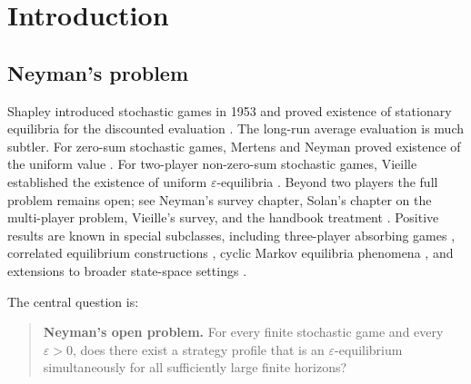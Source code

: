 \documentclass[12pt]{article}
\theoremstyle{definition}
\newcommand{\eps}{\varepsilon}
\newcommand{\1}{\mathbf{1}}
\begin{document}
\begin{abstract}
At each ordinary node and for frozen continuation values, every player faces a
finite communicating average-reward MDP on the internal state space with
continuation rewards at exits. At each degenerate terminal node the local game is
one-state and exact. The normalized bias is unique after fixing one reference
coordinate, local stationary Nash equilibria exist by Kakutani, and the global
frozen-continuation correspondence has a fixed point. Using the first-exit
controller realization supplied by the tree input, the realized profile satisfies a
regret bound of the form
\[
\eta + C_\eta\delta + \frac{K_\eta}{T}.
\]
Choosing the parameters in that order yields the theorem.
\end{abstract}



\tableofcontents

\section{Introduction}

\subsection{Neyman's problem}

Shapley introduced stochastic games in 1953 and proved existence of stationary
equilibria for the discounted evaluation \cite{Shapley1953}. The long-run average
evaluation is much subtler. For zero-sum stochastic games, Mertens and Neyman
proved existence of the uniform value \cite{MertensNeyman1981}. For two-player
non-zero-sum stochastic games, Vieille established the existence of uniform
$\eps$-equilibria \cite{Vieille2000I,Vieille2000II}. Beyond two players the full
problem remains open; see Neyman's survey chapter, Solan's chapter on the
multi-player problem, Vieille's survey, and the handbook treatment
\cite{Neyman2003,Solan2003,Vieille2002,MertensSorinZamir2003}. Positive results
are known in special subclasses, including three-player absorbing games
\cite{Solan1999}, correlated equilibrium constructions \cite{SolanVieille2002},
cyclic Markov equilibria phenomena \cite{FleschThuijsmanVrieze1997}, and extensions
to broader state-space settings \cite{Nowak2003}.

The central question is:
\begin{quote}
\textbf{Neyman's open problem.}
For every finite stochastic game and every $\eps>0$, does there exist a strategy
profile that is an $\eps$-equilibrium simultaneously for all sufficiently large
finite horizons?
\end{quote}
\end{document}
